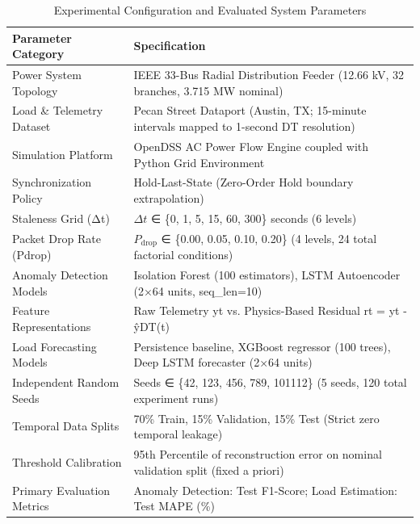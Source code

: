 \begin{table}[htbp]
\centering
\caption{Experimental Configuration and Evaluated System Parameters}
\label{tab:experimental_configuration}
\begin{tabular}{ll}
\hline
\textbf{Parameter Category} & \textbf{Specification} \\
\hline
Power System Topology & IEEE 33-Bus Radial Distribution Feeder (12.66 kV, 32 branches, 3.715 MW nominal) \\
Load \& Telemetry Dataset & Pecan Street Dataport (Austin, TX; 15-minute intervals mapped to 1-second DT resolution) \\
Simulation Platform & OpenDSS AC Power Flow Engine coupled with Python Grid Environment \\
Synchronization Policy & Hold-Last-State (Zero-Order Hold boundary extrapolation) \\
Staleness Grid (Δt) & $\Delta t$ ∈ \{0, 1, 5, 15, 60, 300\} seconds (6 levels) \\
Packet Drop Rate (Pdrop) & $P_{\text{drop}}$ ∈ \{0.00, 0.05, 0.10, 0.20\} (4 levels, 24 total factorial conditions) \\
Anomaly Detection Models & Isolation Forest (100 estimators), LSTM Autoencoder (2×64 units, seq\_len=10) \\
Feature Representations & Raw Telemetry yt vs. Physics-Based Residual rt = yt - ŷDT(t) \\
Load Forecasting Models & Persistence baseline, XGBoost regressor (100 trees), Deep LSTM forecaster (2×64 units) \\
Independent Random Seeds & Seeds ∈ \{42, 123, 456, 789, 101112\} (5 seeds, 120 total experiment runs) \\
Temporal Data Splits & 70\% Train, 15\% Validation, 15\% Test (Strict zero temporal leakage) \\
Threshold Calibration & 95th Percentile of reconstruction error on nominal validation split (fixed a priori) \\
Primary Evaluation Metrics & Anomaly Detection: Test F1-Score; Load Estimation: Test MAPE (\%) \\
\hline
\end{tabular}
\end{table}
